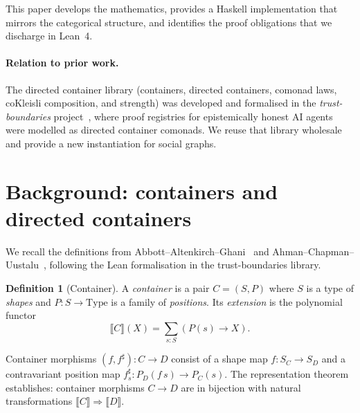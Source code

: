 \documentclass[11pt,a4paper]{article}
\theoremstyle{definition}
\newtheorem{definition}{Definition}[section]
\theoremstyle{plain}
\theoremstyle{remark}
\begin{document}
This paper develops the mathematics, provides a Haskell implementation
that mirrors the categorical structure, and identifies the proof
obligations that we discharge in Lean~4.

\paragraph{Relation to prior work.}
The directed container library (containers, directed containers,
comonad laws, coKleisli composition, and strength) was developed and
formalised in the \emph{trust-boundaries} project~\cite{trust}, where
proof registries for epistemically honest AI agents were modelled as
directed container comonads. We reuse that library wholesale and
provide a new instantiation for social graphs.

\section{Background: containers and directed containers}
\label{sec:background}

We recall the definitions from Abbott--Altenkirch--Ghani~\cite{aag}
and Ahman--Chapman--Uustalu~\cite{acu}, following the Lean
formalisation in the trust-boundaries library.

\begin{definition}[Container]
A \emph{container} is a pair $C = (S, P)$ where $S$ is a type of
\emph{shapes} and $P : S \to \mathrm{Type}$ is a family of
\emph{positions}. Its \emph{extension} is the polynomial functor
\[
  \llbracket C \rrbracket(X) = \sum_{s : S} (P(s) \to X).
\]
\end{definition}

Container morphisms $(f, f^\sharp) : C \to D$ consist of a shape map
$f : S_C \to S_D$ and a contravariant position map
$f^\sharp_s : P_D(f\,s) \to P_C(s)$. The representation theorem
establishes: container morphisms $C \to D$ are in bijection with
natural transformations
$\llbracket C \rrbracket \Rightarrow \llbracket D \rrbracket$.
\end{document}
